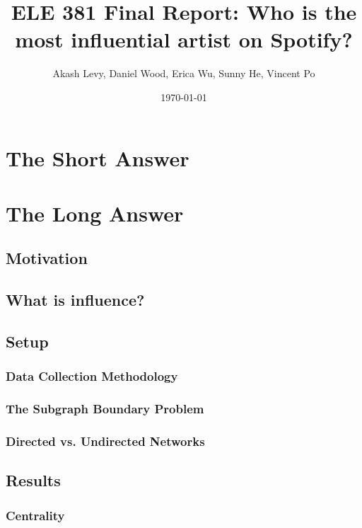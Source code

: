 \documentclass[12pt, oneside]{article}
\title{ELE 381 Final Report: Who is the most influential artist on Spotify?}
\author{Akash Levy, Daniel Wood, Erica Wu, Sunny He, Vincent Po}
\date{\today}
\begin{document}
\maketitle

\section{The Short Answer}

\section{The Long Answer}

\subsection{Motivation}

\subsection{What is influence?}

\subsection{Setup}

\subsubsection{Data Collection Methodology}

\subsubsection{The Subgraph Boundary Problem}

\subsubsection{Directed vs. Undirected Networks}

\subsection{Results}

\subsubsection{Centrality}
\end{document}
